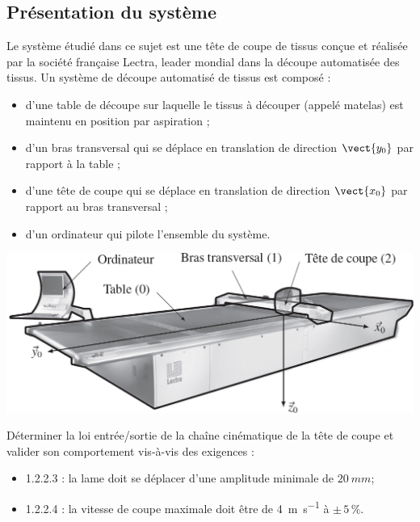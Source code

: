 \setcounter{exo}{0}



\ifprof
\else
\begin{multicols}{2}
\fi


\subsection*{Présentation du système}
\ifprof
\else
Le système étudié dans ce sujet est une tête de coupe de tissus conçue et réalisée par la société
française Lectra, leader mondial dans la découpe automatisée des tissus.
Un système de découpe automatisé de tissus est composé :
\begin{itemize}
\item d'une table de découpe sur laquelle le tissus à découper (appelé matelas) est maintenu en position
par aspiration ;
\item d'un bras transversal qui se déplace en translation de direction $\vect{y_0}$ par rapport à la table ;
\item d'une tête de coupe qui se déplace en translation de direction $\vect{x_0}$ par rapport au bras transversal ;
\item d'un ordinateur qui pilote l’ensemble du système. 
\end{itemize}
\begin{center}
\includegraphics[width=\linewidth]{images/fig_02}
\end{center}

\begin{obj}
Déterminer la loi entrée/sortie de la chaîne cinématique de la tête de coupe et valider son
comportement vis-à-vis des exigences :
\begin{itemize}
\item 1.2.2.3 : la lame doit se déplacer d'une amplitude minimale de $\SI{20}{mm}$;
\item 1.2.2.4 : la vitesse de coupe maximale doit être de \SI{4}{m.s^{-1}} à $\pm\,5\,\%$. 
\end{itemize}
\end{obj}


\end{multicols}

